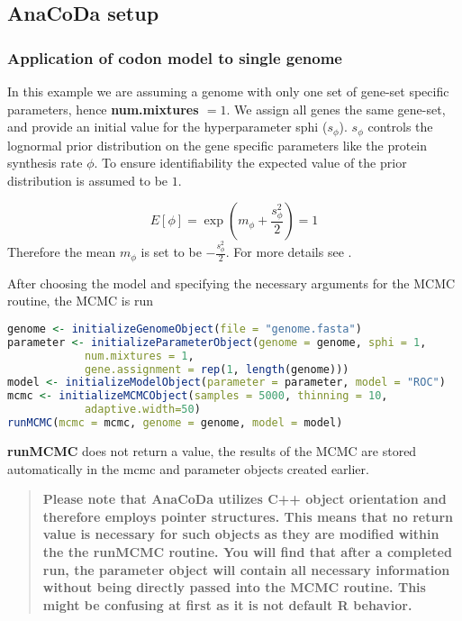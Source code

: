 \subsection{AnaCoDa setup}
\subsubsection{Application of codon model to single genome}
In this example we are assuming a genome with only one set of gene-set specific parameters, hence \textbf{num.mixtures $ = 1$}. 
We assign all genes the same gene-set, and provide an initial value for the hyperparameter sphi ($s_\phi$). $s_\phi$ controls the lognormal prior distribution on the gene specific parameters like the protein synthesis rate $\phi$. 
To ensure identifiability the expected value of the prior distribution is assumed to be $1$.

\begin{equation}
E[\phi] = \exp\left(m_\phi + \frac{s^2_\phi}{2}\right) = 1
\end{equation}
Therefore the mean $m_\phi$ is set to be $-\frac{s^2_\phi}{2}$.
For more details see \citet{gilchrist2015}.

After choosing the model and specifying the necessary arguments for the MCMC routine, the MCMC is run

\begin{lstlisting}[language=R]
genome <- initializeGenomeObject(file = "genome.fasta")
parameter <- initializeParameterObject(genome = genome, sphi = 1, 
			num.mixtures = 1, 
			gene.assignment = rep(1, length(genome)))
model <- initializeModelObject(parameter = parameter, model = "ROC")
mcmc <- initializeMCMCObject(samples = 5000, thinning = 10, 
			adaptive.width=50)
runMCMC(mcmc = mcmc, genome = genome, model = model)
\end{lstlisting}

\textbf{runMCMC} does not return a value, the results of the MCMC are stored automatically in the mcmc and parameter
objects created earlier.

\begin{quote}
\textbf{Please note that AnaCoDa utilizes C++ object orientation and therefore employs pointer structures. 
This means that no return value is necessary for such objects as they are modified within the the runMCMC routine. 
You will find that after a completed run, the parameter object will contain all necessary information without being directly passed into the MCMC routine. 
This might be confusing at first as it is not default R behavior.}
\end{quote}

